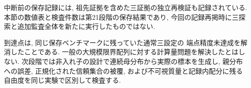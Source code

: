中断前の保存記録には, 祖先証拠を含めた三証拠の独立再検証も記録されている.
本節の数値表と検査件数は第21段階の保存結果であり,
今回の記録再掲時に三探索と追加監査全体を新たに実行したものではない.

到達点は, 同じ保存ベンチマークに残っていた通常三設定の
端点精度未達成を解消したことである.
一般の大規模限界配列に対する計算量問題を解決したとはしない.
次段階では非入れ子の設計で連続母分布から実際の標本を生成し,
親分布への誤差, 正規化された信頼集合の被覆,
および不可視質量と記録内配分に残る自由度を同じ実験で区別して検査する.
